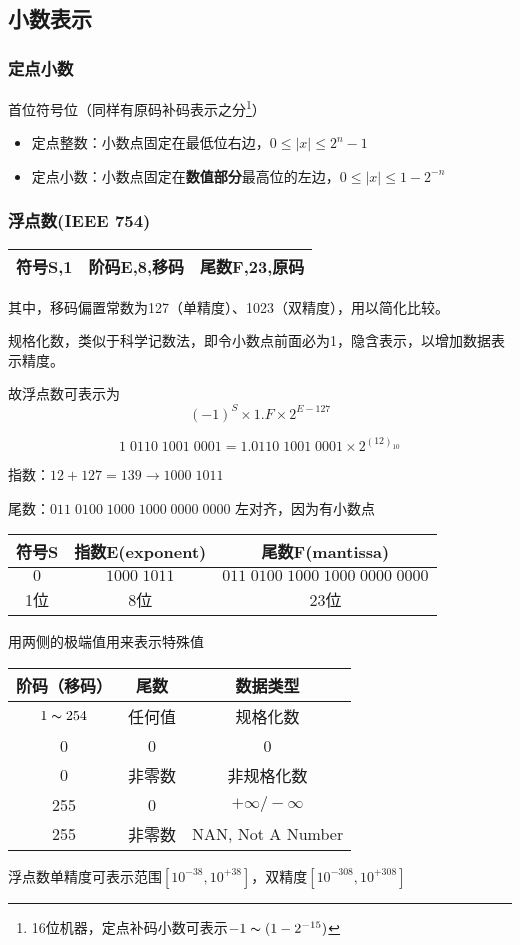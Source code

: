 \subsection{小数表示}
\subsubsection{定点小数}
首位符号位（同样有原码补码表示之分\footnote{16位机器，定点补码小数可表示$-1\thicksim (1-2^{-15})$}）
\begin{itemize}
	\item 定点整数：小数点固定在最低位右边，$0\leq|x|\leq 2^n-1$
	\item 定点小数：小数点固定在\textbf{数值部分}最高位的左边，$0\leq|x|\leq 1-2^{-n}$
\end{itemize}

\subsubsection{浮点数(IEEE 754)}
\begin{center}
\begin{tabular}{|c|c|c|}\hline
符号S,1 & 阶码E,8,移码 & 尾数F,23,原码
\\\hline
\end{tabular}
\end{center}
其中，移码偏置常数为127（单精度）、1023（双精度），用以简化比较。
\par 规格化数，类似于科学记数法，即令小数点前面必为1，隐含表示，以增加数据表示精度。
\par 故浮点数可表示为
\[(-1)^S\times1.F\times 2^{E-127}\]
\begin{example}
\[1\;0110\;1001\;0001=1.0110\;1001\;0001\times 2^{(12)_{10}}\]
\par 指数：$12+127=139\to 1000\;1011$
\par 尾数：$011\;0100\;1000\;1000\;0000\;0000$ 左对齐，因为有小数点
\begin{center}
\begin{tabular}[htbp]{|c|c|c|}
\hline
符号S & 指数E(exponent) & 尾数F(mantissa)\\\hline
$0$ & $1000\;1011$ & $011\;0100\;1000\;1000\;0000\;0000$\\\hline
1位 & 8位 & 23位\\\hline
\end{tabular}
\end{center}
\end{example}
\par 用两侧的极端值用来表示特殊值
\begin{center}
\begin{tabular}{ccc}
阶码（移码） & 尾数 & 数据类型\\\hline
$1\thicksim 254$ & 任何值 & 规格化数\\
0 & 0 & 0\\
0 & 非零数 & 非规格化数\\
255 & 0 & $+\infty/-\infty$\\
255 & 非零数 & NAN, Not A Number
\end{tabular}
\end{center}
\par 浮点数单精度可表示范围$[10^{-38},10^{+38}]$，双精度$[10^{-308},10^{+308}]$

